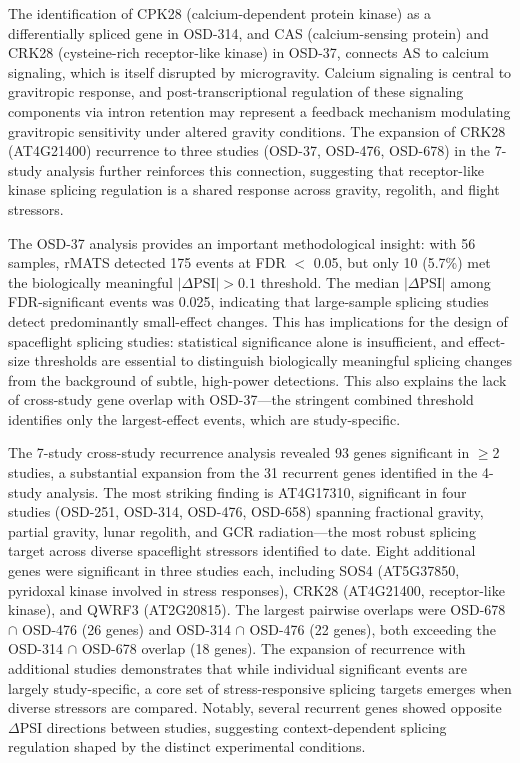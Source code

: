 \documentclass[12pt,a4paper]{article}
\begin{document}
The identification of CPK28 (calcium-dependent protein kinase) as a differentially spliced gene in OSD-314, and CAS (calcium-sensing protein) and CRK28 (cysteine-rich receptor-like kinase) in OSD-37, connects AS to calcium signaling, which is itself disrupted by microgravity. Calcium signaling is central to gravitropic response, and post-transcriptional regulation of these signaling components via intron retention may represent a feedback mechanism modulating gravitropic sensitivity under altered gravity conditions. The expansion of CRK28 (AT4G21400) recurrence to three studies (OSD-37, OSD-476, OSD-678) in the 7-study analysis further reinforces this connection, suggesting that receptor-like kinase splicing regulation is a shared response across gravity, regolith, and flight stressors.

The OSD-37 analysis provides an important methodological insight: with 56 samples, rMATS detected 175 events at FDR $<$ 0.05, but only 10 (5.7\%) met the biologically meaningful $|\Delta\text{PSI}| > 0.1$ threshold. The median $|\Delta\text{PSI}|$ among FDR-significant events was 0.025, indicating that large-sample splicing studies detect predominantly small-effect changes. This has implications for the design of spaceflight splicing studies: statistical significance alone is insufficient, and effect-size thresholds are essential to distinguish biologically meaningful splicing changes from the background of subtle, high-power detections. This also explains the lack of cross-study gene overlap with OSD-37---the stringent combined threshold identifies only the largest-effect events, which are study-specific.

The 7-study cross-study recurrence analysis revealed 93 genes significant in $\geq$2 studies, a substantial expansion from the 31 recurrent genes identified in the 4-study analysis. The most striking finding is AT4G17310, significant in four studies (OSD-251, OSD-314, OSD-476, OSD-658) spanning fractional gravity, partial gravity, lunar regolith, and GCR radiation---the most robust splicing target across diverse spaceflight stressors identified to date. Eight additional genes were significant in three studies each, including SOS4 (AT5G37850, pyridoxal kinase involved in stress responses), CRK28 (AT4G21400, receptor-like kinase), and QWRF3 (AT2G20815). The largest pairwise overlaps were OSD-678 $\cap$ OSD-476 (26 genes) and OSD-314 $\cap$ OSD-476 (22 genes), both exceeding the OSD-314 $\cap$ OSD-678 overlap (18 genes). The expansion of recurrence with additional studies demonstrates that while individual significant events are largely study-specific, a core set of stress-responsive splicing targets emerges when diverse stressors are compared. Notably, several recurrent genes showed opposite $\Delta$PSI directions between studies, suggesting context-dependent splicing regulation shaped by the distinct experimental conditions.
\end{document}
